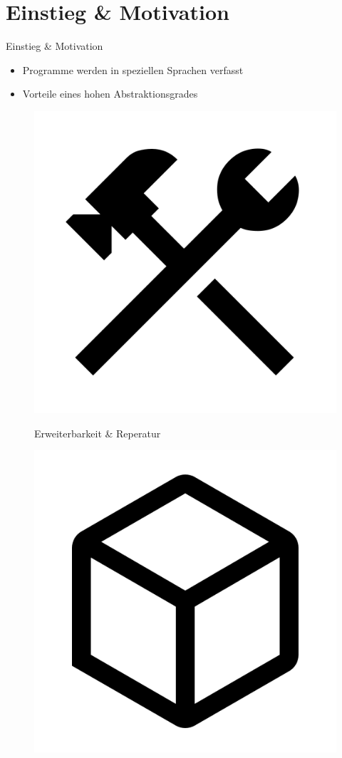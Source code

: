 \section{Einstieg \& Motivation}
\begin{frame}{Einstieg \& Motivation}
	\begin{itemize}
		\item Programme werden in speziellen Sprachen verfasst
		\item Vorteile eines hohen Abstraktionsgrades~
	\end{itemize}

	\begin{figure}[h]
		\begin{minipage}{.32\textwidth}
			\begin{center}
				\centering
				\centerline{\includegraphics[width=.5\textwidth]{assets/google_icon_construction.png}}
				{\small Erweiterbarkeit \& Reperatur}
			\end{center}
		\end{minipage}
		\hfill
		\begin{minipage}{.32\textwidth}
			\begin{center}
				\centerline{\includegraphics[width=.5\textwidth]{assets/google_icon_deployed_code.png}}

\end{center}
\end{minipage}
\end{figure}
\end{frame}
